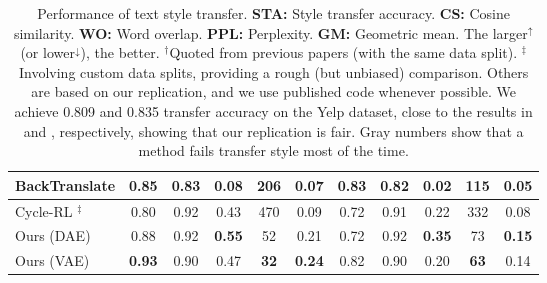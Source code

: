 \documentclass[11pt,a4paper]{article}
\begin{document}
\begin{table}[!t]
{\begin{tabular}{|l||c|c|c|c|c||c|c|c|c|c| }
			BackTranslate \cite{prabhumoye2018style}   & 0.85                                        & 0.83                                         & 0.08                   & 206                       & 0.07                   & \textbf{0.83}              & 0.82                       & 0.02                   & 115                       & 0.05                       \\ \hline
			Cycle-RL \cite{xu2018unpaired} $^\ddag$    & 0.80                                        & 0.92                                         & 0.43                   & 470                       & 0.09                   & 0.72                       & 0.91                       & {0.22}                 & 332                       & 0.08                       \\ \hline\hline
			Ours (DAE)                                 & 0.88                                        & 0.92                                         & \textbf{0.55}          & 52                        & 0.21                   & 0.72                       & 0.92                       & \textbf{0.35}          & 73                        & \textbf{0.15}              \\ \hline
			Ours (VAE)                                 & \textbf{0.93}                               & 0.90                                         & 0.47                   & \textbf{32}               & \textbf{0.24}          & 0.82                       & 0.90                       & 0.20                   & \textbf{63}               & 0.14                       \\ \hline
		\end{tabular}}
	\vspace{-.2cm}
	\caption{Performance of text style transfer. \textbf{STA:} Style transfer accuracy. \textbf{CS:} Cosine similarity. \textbf{WO:} Word overlap. \textbf{PPL:} Perplexity. \textbf{GM:} Geometric mean. The larger$^\uparrow$ (or lower$^\downarrow$), the better.  $^\dag$Quoted from previous papers (with the same data split). $^\ddag$Involving custom data splits, providing a rough (but unbiased) comparison. Others are based on our replication, and we use published code whenever possible. We achieve 0.809 and 0.835 transfer accuracy on the Yelp dataset, close to the results in \citet{shen2017style} and \citet{zhao2018adversarially}, respectively, showing that our replication is fair. Gray numbers show that a method fails transfer style most of the time.}\vspace{-.2cm}
	\label{tab:comparison-previous}
\end{table}
\end{document}
